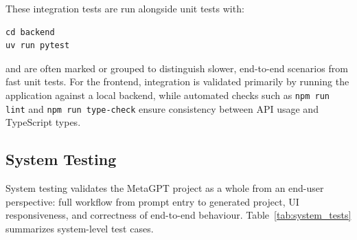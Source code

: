 These integration tests are run alongside unit tests with:
\begin{verbatim}
cd backend
uv run pytest
\end{verbatim}
and are often marked or grouped to distinguish slower, end-to-end scenarios from fast unit tests. For the frontend, integration is validated primarily by running the application against a local backend, while automated checks such as \texttt{npm run lint} and \texttt{npm run type-check} ensure consistency between API usage and TypeScript types.

\subsection{System Testing}

System testing validates the MetaGPT project as a whole from an end-user perspective: full workflow from prompt entry to generated project, UI responsiveness, and correctness of end-to-end behaviour. Table~\ref{tab:system_tests} summarizes system-level test cases.

